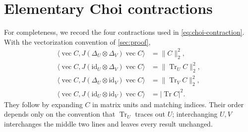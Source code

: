 \documentclass[11pt,reqno]{amsart}
\theoremstyle{remark}
\DeclareMathOperator{\Tr}{Tr}
\newcommand{\id}{\mathrm{id}}
\newcommand{\ip}[2]{\langle #1,#2\rangle}
\newcommand{\norm}[1]{\lVert #1\rVert}
\newcommand{\abs}[1]{\lvert #1\rvert}
\newcommand{\vecop}{\operatorname{vec}}
\begin{document}
\section{Elementary Choi contractions}
\label{app:choi}

For completeness, we record the four contractions used in
\cref{eq:choi-contraction}.  With the vectorization convention of
\cref{sec:proof},
\begin{align*}
  \ip{\vecop C}{J(\Delta_U\otimes\Delta_V)\vecop C}
    &=\norm C_2^2,\\
  \ip{\vecop C}{J(\id_U\otimes\Delta_V)\vecop C}
    &=\norm{\Tr_U C}_2^2,\\
  \ip{\vecop C}{J(\Delta_U\otimes\id_V)\vecop C}
    &=\norm{\Tr_V C}_2^2,\\
  \ip{\vecop C}{J(\id_U\otimes\id_V)\vecop C}
    &=\abs{\Tr C}^2.
\end{align*}
They follow by expanding $C$ in matrix units and matching indices.  Their
order depends only on the convention that $\Tr_U$ traces out $U$; interchanging
$U,V$ interchanges the middle two lines and leaves every result unchanged.
\end{document}
